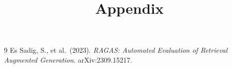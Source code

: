 \documentclass[12pt]{article}
\title{Appendix}
\author{}
\date{}
\begin{document}
\maketitle
\tableofcontents
\newpage



\begin{thebibliography}{9}
Es Sadig, S., et al.\ (2023).
\textit{RAGAS: Automated Evaluation of Retrieval Augmented Generation}.
arXiv:2309.15217.
\end{thebibliography}
\end{document}
